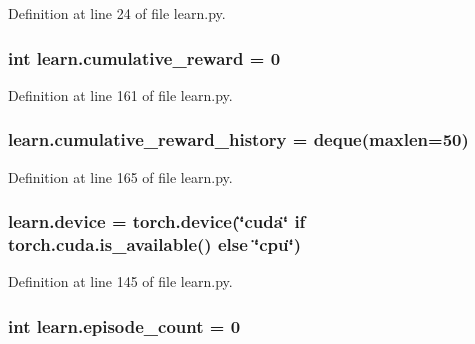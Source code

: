 Definition at line 24 of file learn.\+py.

\subsubsection[{\texorpdfstring{cumulative\+\_\+reward}{cumulative_reward}}]{\setlength{\rightskip}{0pt plus 5cm}int learn.\+cumulative\+\_\+reward = 0}\hypertarget{namespacelearn_ab5c577e91e23a790a4813443943e0be3}{}\label{namespacelearn_ab5c577e91e23a790a4813443943e0be3}


Definition at line 161 of file learn.\+py.

\subsubsection[{\texorpdfstring{cumulative\+\_\+reward\+\_\+history}{cumulative_reward_history}}]{\setlength{\rightskip}{0pt plus 5cm}learn.\+cumulative\+\_\+reward\+\_\+history = deque(maxlen=50)}\hypertarget{namespacelearn_ad9217367bd7e61622cd66dfcdaf6b1e8}{}\label{namespacelearn_ad9217367bd7e61622cd66dfcdaf6b1e8}


Definition at line 165 of file learn.\+py.

\subsubsection[{\texorpdfstring{device}{device}}]{\setlength{\rightskip}{0pt plus 5cm}learn.\+device = torch.\+device(\char`\"{}cuda\char`\"{} if torch.\+cuda.\+is\+\_\+available() else \char`\"{}cpu\char`\"{})}\hypertarget{namespacelearn_ae55deaa379fcb61fd26a801452c29737}{}\label{namespacelearn_ae55deaa379fcb61fd26a801452c29737}


Definition at line 145 of file learn.\+py.

\subsubsection[{\texorpdfstring{episode\+\_\+count}{episode_count}}]{\setlength{\rightskip}{0pt plus 5cm}int learn.\+episode\+\_\+count = 0}\hypertarget{namespacelearn_a789e811e8744ef36689cd7a37bd5aeb2}{}\label{namespacelearn_a789e811e8744ef36689cd7a37bd5aeb2}


